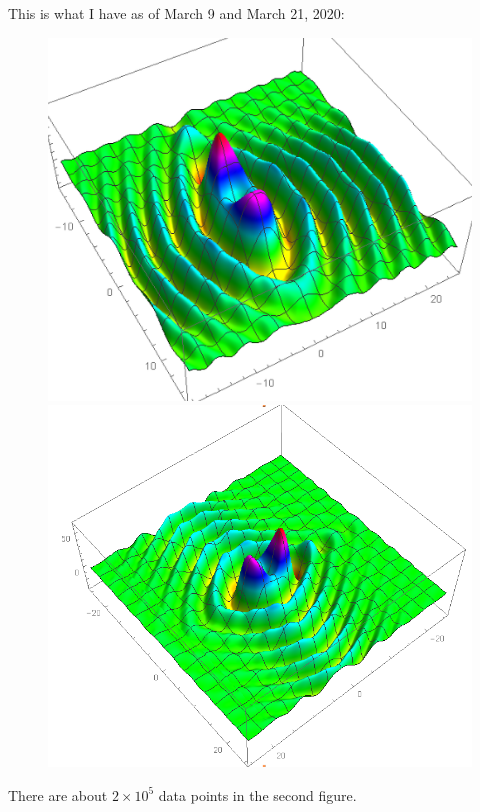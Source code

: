 \documentclass{article}
\theoremstyle{definition}
\begin{document}
This is what I have as of March 9 and March 21, 2020:
\begin{figure}[!htb]
	\centering
	\includegraphics[scale=0.45]{conv-9}
	\includegraphics[scale=0.4]{conv-10}
\end{figure}



There are about $2\times 10^5$ data points in the second figure. 
\end{document}
